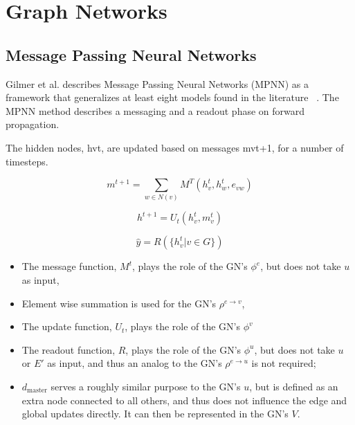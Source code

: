 \section{Graph Networks}

\subsection{Message Passing Neural Networks}

Gilmer et al. describes Message Passing Neural Networks (MPNN) as a framework that generalizes at least eight models found in the literature ~\cite{Gilmer_2017}. The MPNN method describes a messaging and a readout phase on forward propagation.
	
The hidden nodes, hvt, are updated based on messages mvt+1, for a number of timesteps.

\begin{equation}
    \label{eqn:message}
    m^{t+1} = \sum_{w \in N(v)} M ^ {T} (h^t_v, h^t_w, e_{vw})
\end{equation}

\begin{equation}
    h^{t+1} = U_t(h^t_v, m^t_v)
\end{equation}

\begin{equation}
    \hat{y} = R (\{h^t_v | v \in G\})
\end{equation}

\begin{itemize}

    \item The message function, $M^{t}$, plays the role of the GN’s $\phi ^ e$, but does not take $u$ as input,
    
    \item Element wise summation is used for the GN’s $\rho ^ {e \rightarrow v}$,
    
    \item The update function, $U_t$, plays the role of the GN’s $\phi ^ v$
    
    \item The readout function, $R$, plays the role of the GN’s $\phi ^ u$, but does not take $u$ or $E'$ as input, and thus an analog to the GN’s $\rho ^ {e \rightarrow u}$ is not required;
    
    \item $d_{\text{master}}$ serves a roughly similar purpose to the GN’s $u$, but is defined as an extra node connected to all others, and thus does not influence the edge and global updates directly. It can then be represented in the GN’s $V$.

\end{itemize}

